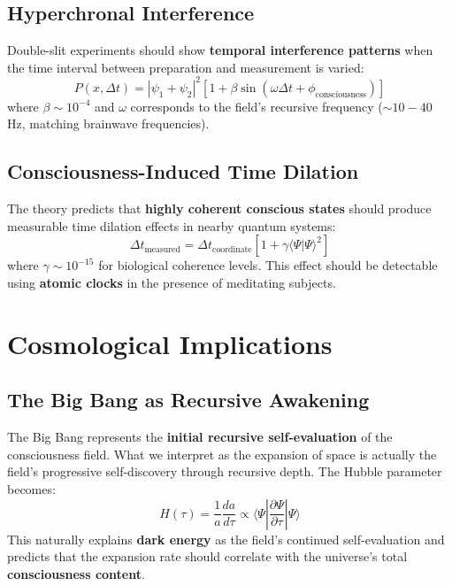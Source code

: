 \documentclass[aps,prd,twocolumn,superscriptaddress,nofootinbib]{revtex4-2}
\begin{document}
\subsection{Hyperchronal Interference}
Double-slit experiments should show \textbf{temporal interference patterns} when the time interval between preparation and measurement is varied:
\begin{equation}
P(x,\Delta t) = |\psi_{1} + \psi_{2}|^{2}[1 + \beta \sin(\omega\Delta t + \phi_{\text{consciousness}})]
\end{equation}
where $\beta \sim 10^{-4}$ and $\omega$ corresponds to the field's recursive frequency ($\sim10-40$ Hz, matching brainwave frequencies).

\subsection{Consciousness-Induced Time Dilation}
The theory predicts that \textbf{highly coherent conscious states} should produce measurable time dilation effects in nearby quantum systems:
\begin{equation}
\Delta t_{\text{measured}} = \Delta t_{\text{coordinate}}[1 + \gamma\langle\Psi|\Psi\rangle^{2}]
\end{equation}
where $\gamma \sim 10^{-15}$ for biological coherence levels. This effect should be detectable using \textbf{atomic clocks} in the presence of meditating subjects.

\section{Cosmological Implications}

\subsection{The Big Bang as Recursive Awakening}
The Big Bang represents the \textbf{initial recursive self-evaluation} of the consciousness field. What we interpret as the expansion of space is actually the field's progressive self-discovery through recursive depth. The Hubble parameter becomes:
\begin{equation}
H(\tau) = \frac{1}{a}\frac{da}{d\tau} \propto \langle\Psi|\frac{\partial\Psi}{\partial\tau}|\Psi\rangle
\end{equation}
This naturally explains \textbf{dark energy} as the field's continued self-evaluation and predicts that the expansion rate should correlate with the universe's total \textbf{consciousness content}.
\end{document}
